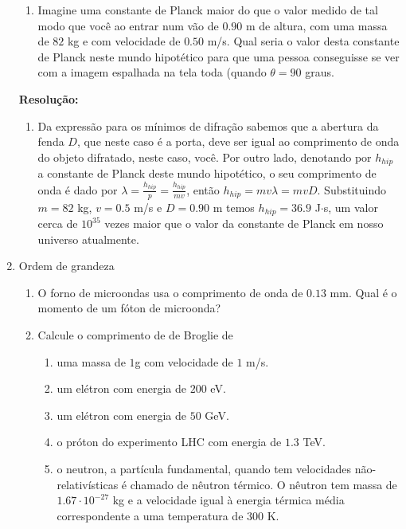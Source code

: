 \documentclass[a4paper, 12pt, notitlepage]{article}
\begin{document}
\begin{enumerate}
\begin{enumerate}
  \item Imagine uma constante de Planck maior do que o valor medido de tal modo que você ao entrar num vão de $0.90$ m de altura, com uma massa de $82$ kg e com velocidade de $0.50$ m/s. Qual seria o valor desta constante de Planck neste mundo hipotético para que uma pessoa conseguisse se ver com a imagem espalhada na tela toda (quando $\theta = 90$ graus.
\end{enumerate} 

\textbf{Resolução: }
\begin{enumerate}
  \item Da expressão para os mínimos de difração sabemos que a abertura da fenda $D$, que neste caso é a porta, deve ser igual ao comprimento de onda do objeto difratado, neste caso, você. Por outro lado, denotando por $h_{hip}$ a constante de Planck deste mundo hipotético, o seu comprimento de onda é dado por $\lambda = \frac{h_{hip}}{p} = \frac{h_{hip}}{mv}$, então $h_{hip} = mv\lambda = mvD$. Substituindo $m = 82$ kg, $v = 0.5$ m/s e $D = 0.90$ m temos $h_{hip} = 36.9$ J$\cdot$s, um valor  cerca de $10^{35}$ vezes maior que o valor da constante de Planck em nosso universo atualmente.
\end{enumerate}

\item Ordem de grandeza

\begin{enumerate}
  \item O forno de microondas usa o comprimento de onda de $0.13$ mm. Qual é o momento de um fóton de microonda?

  \item Calcule o comprimento de de Broglie de
    \begin{enumerate}
      \item uma massa de $1$g com velocidade de $1$ m/s.
      \item um elétron com energia de $200$ eV.
      \item um elétron com energia de $50$ GeV.
      \item o próton do experimento LHC com energia de $1.3$ TeV.
      \item o neutron, a partícula fundamental, quando tem velocidades não-relativísticas é chamado de nêutron térmico. O nêutron tem massa de $1.67 \cdot 10^{-27}$ kg e a velocidade igual à energia térmica média correspondente a uma temperatura de $300$ K.
    \end{enumerate}


\end{enumerate}
\end{enumerate}
\end{document}
